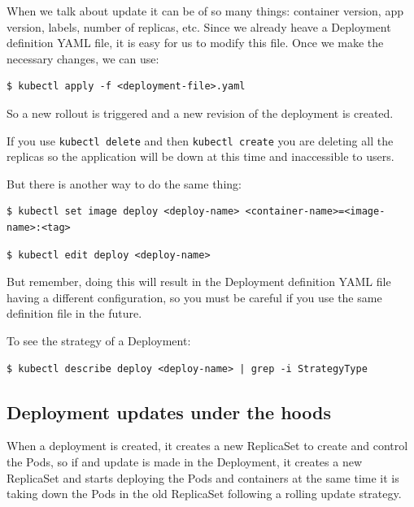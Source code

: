 \documentclass{article}
\newenvironment{blocktemplateIII}[1]{%
    \tcolorbox[beamer,%
    noparskip,breakable,
    ,colframe=Red,%
    colbacklower=LimeGreen!75!LightGreen,%
    title=#1]}%
    {\endtcolorbox}
\newenvironment{codetemplate}[1][]{%
  \mybasecolorbox[#1]
  \itshape
}{%
  \endmybasecolorbox
}
\begin{document}
When we talk about update it can be of so many things: container version, app version, labels, number of replicas, etc. Since we already heave a Deployment definition YAML file, it is easy for us to modify this file. Once we make the necessary changes, we can use:

\begin{codetemplate}{}
\begin{verbatim}
$ kubectl apply -f <deployment-file>.yaml
\end{verbatim}
\end{codetemplate}

So a new rollout is triggered and a new revision  of the deployment is created.

\begin{blocktemplateIII}{WARNING}
If you use \verb|kubectl delete| and then \verb|kubectl create| you are deleting all the replicas so the application will be down at this time and inaccessible to users.
\end{blocktemplateIII}

But there is another way to do the same thing:

\begin{codetemplate}{}
\begin{verbatim}
$ kubectl set image deploy <deploy-name> <container-name>=<image-name>:<tag>
\end{verbatim}
\end{codetemplate}

\begin{codetemplate}{}
\begin{verbatim}
$ kubectl edit deploy <deploy-name>
\end{verbatim}
\end{codetemplate}

\begin{blocktemplateIII}{WARNING}
But remember, doing this will result in the Deployment definition YAML file having a different configuration, so you must be careful if you use the same definition file in the future.
\end{blocktemplateIII}

To see the strategy of a Deployment:
\begin{codetemplate}{}
\begin{verbatim}
$ kubectl describe deploy <deploy-name> | grep -i StrategyType
\end{verbatim}
\end{codetemplate}

\subsection{Deployment updates under the hoods}
When a deployment is created, it creates a new ReplicaSet to create and control the Pods, so if and update is made in the Deployment, it creates a new ReplicaSet and starts deploying the Pods and containers at the same time it is taking down the Pods in the old ReplicaSet following a rolling update strategy.
\end{document}
